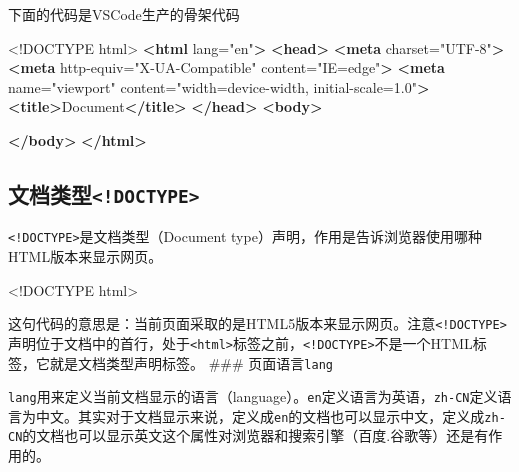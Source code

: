 \documentclass[
]{book}
\newenvironment{Shaded}{\begin{snugshade}}{\end{snugshade}}
\newcommand{\DataTypeTok}[1]{\textcolor[rgb]{0.13,0.29,0.53}{#1}}
\newcommand{\KeywordTok}[1]{\textcolor[rgb]{0.13,0.29,0.53}{\textbf{#1}}}
\newcommand{\NormalTok}[1]{#1}
\newcommand{\OtherTok}[1]{\textcolor[rgb]{0.56,0.35,0.01}{#1}}
\newcommand{\StringTok}[1]{\textcolor[rgb]{0.31,0.60,0.02}{#1}}
\begin{document}
下面的代码是VSCode生产的骨架代码

\begin{Shaded}
\begin{Highlighting}[]
\DataTypeTok{\textless{}!DOCTYPE }\NormalTok{html}\DataTypeTok{\textgreater{}}
\KeywordTok{\textless{}html}\OtherTok{ lang=}\StringTok{"en"}\KeywordTok{\textgreater{}}
\KeywordTok{\textless{}head\textgreater{}}
    \KeywordTok{\textless{}meta}\OtherTok{ charset=}\StringTok{"UTF{-}8"}\KeywordTok{\textgreater{}}
    \KeywordTok{\textless{}meta}\OtherTok{ http{-}equiv=}\StringTok{"X{-}UA{-}Compatible"}\OtherTok{ content=}\StringTok{"IE=edge"}\KeywordTok{\textgreater{}}
    \KeywordTok{\textless{}meta}\OtherTok{ name=}\StringTok{"viewport"}\OtherTok{ content=}\StringTok{"width=device{-}width, initial{-}scale=1.0"}\KeywordTok{\textgreater{}}
    \KeywordTok{\textless{}title\textgreater{}}\NormalTok{Document}\KeywordTok{\textless{}/title\textgreater{}}
\KeywordTok{\textless{}/head\textgreater{}}
\KeywordTok{\textless{}body\textgreater{}}
    
\KeywordTok{\textless{}/body\textgreater{}}
\KeywordTok{\textless{}/html\textgreater{}}
\end{Highlighting}
\end{Shaded}

\hypertarget{ux6587ux6863ux7c7bux578bdoctype}{%
\subsection{\texorpdfstring{文档类型\texttt{\textless{}!DOCTYPE\textgreater{}}}{文档类型\textless!DOCTYPE\textgreater{}}}\label{ux6587ux6863ux7c7bux578bdoctype}}

\texttt{\textless{}!DOCTYPE\textgreater{}}是文档类型（Document type）声明，作用是告诉浏览器使用哪种HTML版本来显示网页。

\begin{Shaded}
\begin{Highlighting}[]
\DataTypeTok{\textless{}!DOCTYPE }\NormalTok{html}\DataTypeTok{\textgreater{}}
\end{Highlighting}
\end{Shaded}

这句代码的意思是：当前页面采取的是HTML5版本来显示网页。注意\texttt{\textless{}!DOCTYPE\textgreater{}}声明位于文档中的首行，处于\texttt{\textless{}html\textgreater{}}标签之前，\texttt{\textless{}!DOCTYPE\textgreater{}}不是一个HTML标签，它就是文档类型声明标签。
\#\#\# 页面语言\texttt{lang}

\texttt{lang}用来定义当前文档显示的语言（language）。\texttt{en}定义语言为英语，\texttt{zh-CN}定义语言为中文。其实对于文档显示来说，定义成\texttt{en}的文档也可以显示中文，定义成\texttt{zh-CN}的文档也可以显示英文这个属性对浏览器和搜索引擎（百度.谷歌等）还是有作用的。
\end{document}
